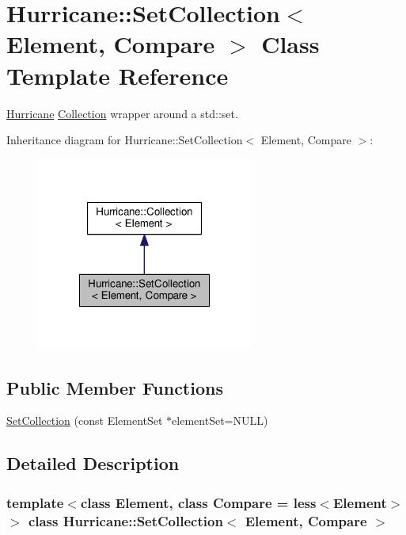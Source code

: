 \hypertarget{classHurricane_1_1SetCollection}{}\section{Hurricane\+:\+:Set\+Collection$<$ Element, Compare $>$ Class Template Reference}
\label{classHurricane_1_1SetCollection}


\hyperlink{namespaceHurricane}{Hurricane} \hyperlink{classHurricane_1_1Collection}{Collection} wrapper around a std\+::set.  




Inheritance diagram for Hurricane\+:\+:Set\+Collection$<$ Element, Compare $>$\+:\nopagebreak
\begin{figure}[H]
\begin{center}
\leavevmode
\includegraphics[width=202pt]{classHurricane_1_1SetCollection__inherit__graph}
\end{center}
\end{figure}
\subsection*{Public Member Functions}
\begin{DoxyCompactItemize}
\item 
\hyperlink{classHurricane_1_1SetCollection_a3ee200fd00f3a6951906209c11c03e34}{Set\+Collection} (const Element\+Set $\ast$element\+Set=N\+U\+LL)
\end{DoxyCompactItemize}


\subsection{Detailed Description}
\subsubsection*{template$<$class Element, class Compare = less$<$\+Element$>$$>$\newline
class Hurricane\+::\+Set\+Collection$<$ Element, Compare $>$}

